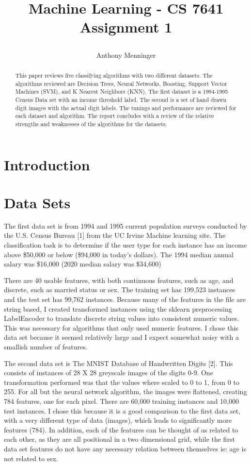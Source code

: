 \documentclass[letterpaper]{article} %
\title{
Machine Learning - CS 7641
Assignment 1
	
}
\author {
    Anthony Menninger \\
}
\begin{document}
\maketitle

\begin{abstract}
This paper reviews five classifying algorithms with two different datasets. The algorithms reviewed are Decision Trees, Neural Networks, Boosting, Support Vector Machines (SVM), and K Nearest Neighbors (KNN).  The first dataset is a 1994-1995 Census Data set with an income threshold label.  The second is a set of hand drawn digit images with the actual digit labels.  The tunings and performance are reviewed for each dataset and algorithm.  The report concludes with a review of the relative strengths and weaknesses of the algorithms for the datasets.
\end{abstract}

\section{Introduction}


\section{Data Sets}

The first data set is from 1994 and 1995 current population surveys conducted by the U.S. Census Bureau [1] from the UC Irvine Machine learning site.  The classification task is to determine if the user type for each instance has an income above \$50,000 or below (\$94,000 in today's dollars).  The 1994 median annual salary was \$16,000 (2020 median salary was \$34,600) 

There are 40 usable features, with both continuous features, such as age, and discrete, such as married status or sex.  The training set has 199,523 instances and the test set has 99,762 instances.  Because many of the features in the file are string based, I created transformed instances using the sklearn preprocessing LabelEncoder to translate discrete string values into consistent numeric values.  This was necessary for algorithms that only used numeric features. I chose this data set because it seemed relatively large and I expect somewhat noisy with a smallish number of features.  

The second data set is The MNIST Database of Handwritten Digits [2].  This consists of instances of 28 X 28 greyscale images of the digits 0-9.  One transformation performed was that the values where scaled to 0 to 1, from 0 to 255.  For all but the neural network algorithm,  the images were flattened, creating 784 features, one for each pixel.  There are 60,000 training instances and 10,000 test instances.  I chose this because it is a good comparison to the first data set, with a very different type of data (images), which leads to significantly more features (784).  In addition, each of the features can be thought of as related to each other, as they are all positional in a two dimensional grid, while the first data set features do not have any necessary relation between themselves ie:  age is not related to sex.  
\end{document}
